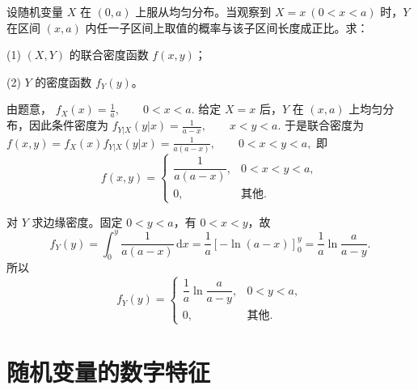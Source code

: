 \documentclass[lang=cn,11pt]{elegantbook}
\begin{document}
\begin{exercise}\label{exer:src-2008-01-3c-iv-03}\label{exer:src-paper4-iv-03}
设随机变量 \(X\) 在 \((0,a)\) 上服从均匀分布。当观察到 \(X=x\ (0<x<a)\) 时，\(Y\) 在区间 \((x,a)\) 内任一子区间上取值的概率与该子区间长度成正比。求：\par
(1) \((X,Y)\) 的联合密度函数 \(f(x,y)\)；\par
(2) \(Y\) 的密度函数 \(f_Y(y)\)。
\end{exercise}
\begin{solution}
由题意，
\(
f_X(x)=\frac1a,\qquad 0<x<a.
\)
给定 \(X=x\) 后，\(Y\) 在 \((x,a)\) 上均匀分布，因此条件密度为
\(
f_{Y|X}(y|x)=\frac1{a-x},\qquad x<y<a.
\)
于是联合密度为
\(
f(x,y)=f_X(x)f_{Y|X}(y|x)
=\frac1{a(a-x)},\qquad 0<x<y<a,
\)
即
\[
f(x,y)=
\begin{cases}
\dfrac1{a(a-x)}, & 0<x<y<a,\\[8pt]
0, & \text{其他}.
\end{cases}
\]

对 \(Y\) 求边缘密度。固定 \(0<y<a\)，有 \(0<x<y\)，故
\[
f_Y(y)=\int_0^y \frac1{a(a-x)}\,\mathrm{d}x
=\frac1a\left[-\ln(a-x)\right]_0^y
=\frac1a\ln\frac{a}{a-y}.
\]
所以
\[
f_Y(y)=
\begin{cases}
\dfrac1a\ln\dfrac{a}{a-y}, & 0<y<a,\\[10pt]
0, & \text{其他}.
\end{cases}
\]
\end{solution}

\chapter{随机变量的数字特征}
\end{document}
